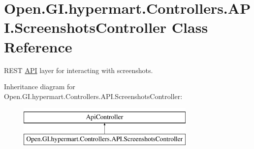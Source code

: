 \hypertarget{class_open_1_1_g_i_1_1hypermart_1_1_controllers_1_1_a_p_i_1_1_screenshots_controller}{}\section{Open.\+G\+I.\+hypermart.\+Controllers.\+A\+P\+I.\+Screenshots\+Controller Class Reference}
\label{class_open_1_1_g_i_1_1hypermart_1_1_controllers_1_1_a_p_i_1_1_screenshots_controller}


R\+E\+ST \hyperlink{namespace_open_1_1_g_i_1_1hypermart_1_1_controllers_1_1_a_p_i}{A\+PI} layer for interacting with screenshots.  


Inheritance diagram for Open.\+G\+I.\+hypermart.\+Controllers.\+A\+P\+I.\+Screenshots\+Controller\+:\begin{figure}[H]
\begin{center}
\leavevmode
\includegraphics[height=2.000000cm]{class_open_1_1_g_i_1_1hypermart_1_1_controllers_1_1_a_p_i_1_1_screenshots_controller}
\end{center}
\end{figure}
